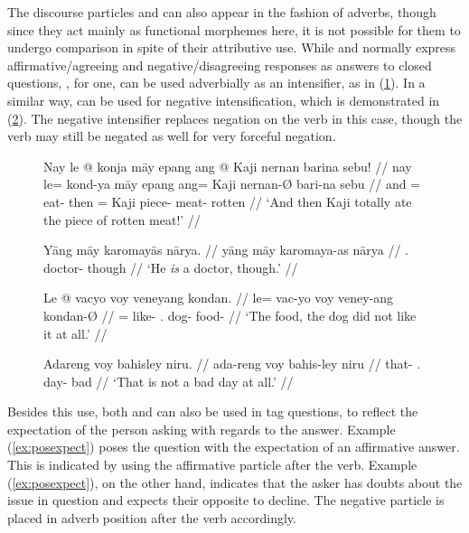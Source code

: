 The discourse particles  and  can also
appear in the fashion of adverbs, though since they act mainly as functional
morphemes here, it is not possible for them to undergo comparison in spite of
their attributive use. While  and 
normally express affirmative/agreeing and negative/disagreeing responses as answers to closed
questions, , for one, can be used adverbially as an
intensifier, as in (\ref{ex:maayintens}). In a similar way,  can
be used for negative intensification, which is demonstrated in 
(\ref{ex:voyintens}). The negative intensifier replaces negation on the verb in
this case, though the verb may still be negated as well for very forceful
negation.

\begin{figure}[h]
\pex\label{ex:maayintens}
\a\begingl
	\gla Nay le @ konja māy epang ang @ Kaji nernan barina sebu! //
	\glb nay le= kond-ya māy epang ang= Kaji nernan-Ø bari-na sebu //
	\glc and \PatTI{}= eat-\TsgM{} \Int{} then \Aarg{}= Kaji piece-\Top{} 
		meat-\Gen{} rotten //
	\glft `And then Kaji totally ate the piece of rotten meat!' //
\endgl

\a\begingl
	\gla Yāng māy karomayās nārya. //
	\glb yāng māy karomaya-as nārya //
	\glc \TsgM{}.\Aarg{} \Int{} doctor-\Parg{} though // 
	\glft `He \emph{is} a doctor, though.' //
\endgl
\xe
\end{figure}

\begin{figure}[h]
\pex\label{ex:voyintens}
\a\begingl
	\gla Le @ vacyo voy veneyang kondan. //
	\glb le= vac-yo voy veney-ang kondan-Ø //
	\glc \PatTI{}= like-\TsgN{} \Int{}.\Neg{} dog-\Aarg{} food-\Top{} //
	\glft `The food, the dog did not like it at all.' //
\endgl

\a\begingl
	\gla Adareng voy bahisley niru. //
	\glb ada-reng voy bahis-ley niru //
	\glc that-\AargI{} \Int{}.\Neg{} day-\PargI{} bad // 
	\glft `That is not a bad day at all.' //
\endgl
\xe
\end{figure}

Besides this use, both  and  can also be used in
tag questions, to reflect the expectation of the person asking with regards to
the answer. Example (\ref{ex:posexpect}) poses the question with the
expectation of an affirmative answer. This is indicated by using the
affirmative particle  after the verb. Example 
(\ref{ex:posexpect}), on the other hand, indicates that the asker has doubts
about the issue in question and expects their opposite to decline. The negative
particle  is placed in adverb position after the verb
accordingly.

